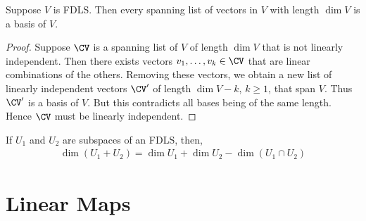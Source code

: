 \documentclass{article}
\begin{document}
  \begin{prop}
    Suppose $V$ is FDLS. Then every spanning list of vectors in $V$ with length $\dim V$ is a basis of $V$.
  \end{prop}
  \begin{proof}
    Suppose $\CV$ is a spanning list of $V$ of length $\dim V$ that is not linearly independent. Then there exists vectors $v_1, \dots, v_k \in \CV$ that are linear
    combinations of the others. Removing these vectors, we obtain a new list of linearly independent vectors $\CV^\prime$ of length $\dim V - k$, $k \geq 1$, that span $V$.
    Thus $\CV^\prime$ is a basis of $V$. But this contradicts all bases being of the same length. Hence $\CV$ must be linearly independent.
  \end{proof}
  \begin{prop}
    If $U_1$ and $U_2$ are subspaces of an FDLS, then,
    \begin{align*}
      \dim(U_1 + U_2) = \dim U_1 + \dim U_2 - \dim(U_1 \cap U_2)
    \end{align*}
  \end{prop}
\section{Linear Maps}
\end{document}
